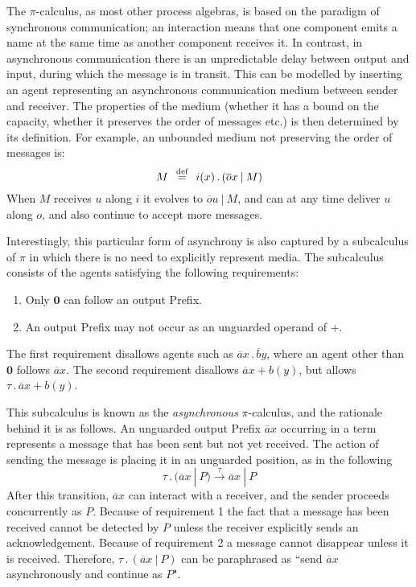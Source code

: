 \documentclass[10pt,a4paper]{article}
\newcommand{\nil}{\mathbf{0}}
\newcommand{\outp}[2]{\overline{#1}#2}
\newcommand{\inpp}[2]{#1(#2)}
\newcommand{\silp}{\tau}
\newcommand{\prefix}[2]{{#1}\,.\,#2}
\newcommand{\out}[3]{\prefix{\outp{#1}{#2}}{#3}}
\newcommand{\inp}[3]{\prefix{\inpp{#1}{#2}}{#3}}
\newcommand{\sil}[1]{\prefix{\silp}{#1}}
\newcommand{\defi}{\buildrel \text{def}\over =}
\newcommand{\para}{\:|\:}
\newcommand{\tran}[3]{#1 \overset{#2}{\longrightarrow} #3}
\begin{document}
The $\pi$-calculus, as most other process algebras, is based on the paradigm of synchronous communication; an interaction means that one component emits a name at the same time as another component receives it. In contrast, in asynchronous communication there is an unpredictable delay between output and input, during which the message is in transit. This can be modelled by inserting an agent representing an asynchronous communication medium between sender and receiver. The properties of the medium (whether it has a bound on the capacity, whether it preserves the order of messages etc.) is then determined by its definition. For example, an unbounded medium not preserving the order of messages is:
\[
M \:\: \defi \:\: \inp{i}{x}{(\outp{o}{x} \para M)}
\]
When $M$ receives $u$ along $i$ it evolves to $\outp{o}{u} \para M$, and can at any time deliver $u$ along $o$, and also continue to accept more messages.

Interestingly, this particular form of asynchrony is also captured by a subcalculus of $\pi$ in which there is no need to explicitly represent media. The subcalculus consists of the agents satisfying the following requirements:

\begin{enumerate}
\item Only $\nil$ can follow an output Prefix.
\item An output Prefix may not occur as an unguarded operand of $+$.
\end{enumerate}

The first requirement disallows agents such as $\out{a}{x}{\outp{b}{y}}$, where an agent other than $\nil$ follows $\outp{a}{x}$. The second requirement disallows $\outp{a}{x} + \inpp{b}{y}$, but allows $\sil{\outp{a}{x}} + \inpp{b}{y}$.

This subcalculus is known as the \emph{asynchronous} $\pi$-calculus, and the rationale behind it is as follows. An unguarded output Prefix $\outp{a}{x}$ occurring in a term represents a message that has been sent but not yet received. The action of sending the message is placing it in an unguarded position, as in the following
\[
\tran{\sil{(\outp{a}{x} \para P)}}{\silp}{\outp{a}{x} \para P}
\]
After this transition, $\outp{a}{x}$ can interact with a receiver, and the sender proceeds concurrently as $P$. Because of requirement 1 the fact that a message has been received cannot be detected by $P$ unless the receiver explicitly sends an acknowledgement. Because of requirement 2 a message cannot disappear unless it is received. Therefore, $\sil{(\outp{a}{x} \para P)}$ can be paraphrased as ``send $\outp{a}{x}$ asynchronously and continue as $P$".
\end{document}
